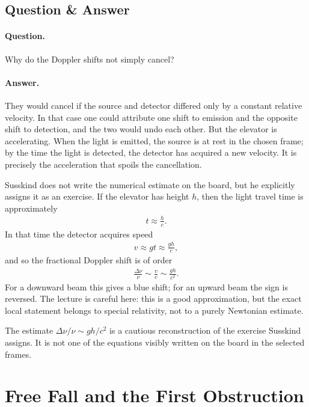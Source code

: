 \subsection{Question \& Answer}

\paragraph{Question.} Why do the Doppler shifts not simply cancel?

\paragraph{Answer.} They would cancel if the source and detector differed only by a constant relative velocity. In that case one could attribute one shift to emission and the opposite shift to detection, and the two would undo each other. But the elevator is accelerating. When the light is emitted, the source is at rest in the chosen frame; by the time the light is detected, the detector has acquired a new velocity. It is precisely the acceleration that spoils the cancellation.

Susskind does not write the numerical estimate on the board, but he explicitly assigns it as an exercise. If the elevator has height \(h\), then the light travel time is approximately
\begin{align}
t \approx \frac{h}{c}.
\end{align}
In that time the detector acquires speed
\begin{align}
v \approx gt \approx \frac{gh}{c},
\end{align}
and so the fractional Doppler shift is of order
\begin{align}
\frac{\Delta \nu}{\nu} \sim \frac{v}{c} \sim \frac{gh}{c^{2}}.
\end{align}
For a downward beam this gives a blue shift; for an upward beam the sign is reversed. The lecture is careful here: this is a good approximation, but the exact local statement belongs to special relativity, not to a purely Newtonian estimate.

\begin{remark}
The estimate \(\Delta \nu/\nu \sim gh/c^{2}\) is a cautious reconstruction of the exercise Susskind assigns. It is not one of the equations visibly written on the board in the selected frames.
\end{remark}

\section{Free Fall and the First Obstruction}

